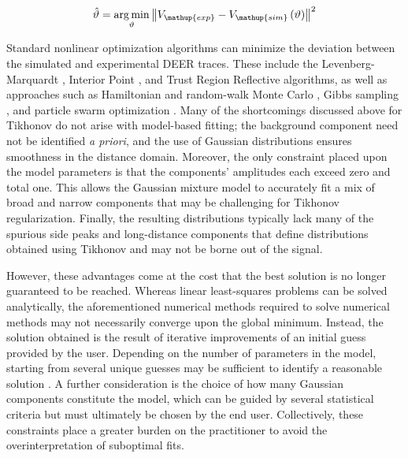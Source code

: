 \begin{equation}
    \hat{\vartheta}=\underset{\vartheta}{\operatorname{\arg \min}} \norm{ V_\mathup{exp} - V_\mathup{sim} \left( \vartheta \right) }^2
\label{eq:deerintro_fitmodel}
\end{equation}

Standard nonlinear optimization algorithms can minimize the deviation between the simulated and experimental DEER traces. These include the Levenberg-Marquardt \citep*{Brandon2012, Levenberg1944, Marquardt1963, Stein2015}, Interior Point \citep*{Hustedt2018, Potra2000}, and Trust Region Reflective \citep*{Byrd1987, FabregasIbanez2020a, Mishra2014} algorithms, as well as approaches such as Hamiltonian \citep*{Hoffman2014, Sweger2020} and random-walk Monte Carlo \citep*{Dzuba2016, Neal1993}, Gibbs sampling \citep*{Edwards2016}, and particle swarm optimization \citep*{Hustedt2018}. Many of the shortcomings discussed above for Tikhonov do not arise with model-based fitting; the background component need not be identified \emph{a priori}, and the use of Gaussian distributions ensures smoothness in the distance domain. Moreover, the only constraint placed upon the model parameters is that the components' amplitudes each exceed zero and total one. This allows the Gaussian mixture model to accurately fit a mix of broad and narrow components that may be challenging for Tikhonov regularization. Finally, the resulting distributions typically lack many of the spurious side peaks and long-distance components that define distributions obtained using Tikhonov and may not be borne out of the signal. 

However, these advantages come at the cost that the best solution is no longer guaranteed to be reached. Whereas linear least-squares problems can be solved analytically, the aforementioned numerical methods required to solve numerical methods may not necessarily converge upon the global minimum. Instead, the solution obtained is the result of iterative improvements of an initial guess provided by the user. Depending on the number of parameters in the model, starting from several unique guesses may be sufficient to identify a reasonable solution \citep*{FabregasIbanez2020a}. A further consideration is the choice of how many Gaussian components constitute the model, which can be guided by several statistical criteria \citep*{Akaike1973, Sugiura1978, Vehtari2017} but must ultimately be chosen by the end user. Collectively, these constraints place a greater burden on the practitioner to avoid the overinterpretation of suboptimal fits.

